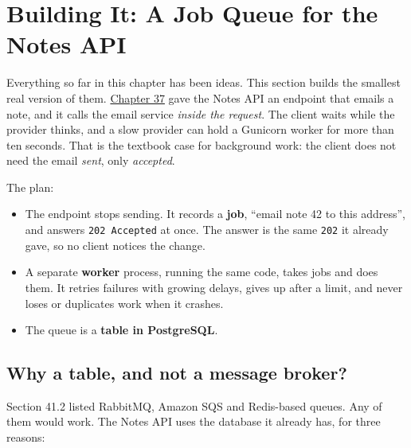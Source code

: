 \setcounter{section}{4}
\section{Building It: A Job Queue for the Notes API}\label{41-event-driven-architecture:415-building-it-a-job-queue-for-the-notes-api}

Everything so far in this chapter has been ideas. This section builds the smallest real version of them. \hyperref[ch:37-reliability]{Chapter 37} gave the Notes API an endpoint that emails a note, and it calls the email service \emph{inside the request}. The client waits while the provider thinks, and a slow provider can hold a Gunicorn worker for more than ten seconds. That is the textbook case for background work: the client does not need the email \emph{sent}, only \emph{accepted}.

The plan:

\begin{itemize}
\tightlist
\item
  The endpoint stops sending. It records a \textbf{job}, ``email note 42 to this address'', and answers \texttt{202\ Accepted} at once. The answer is the same \texttt{202} it already gave, so no client notices the change.
\item
  A separate \textbf{worker} process, running the same code, takes jobs and does them. It retries failures with growing delays, gives up after a limit, and never loses or duplicates work when it crashes.
\item
  The queue is a \textbf{table in PostgreSQL}.
\end{itemize}

\subsection*{Why a table, and not a message broker?}\label{41-event-driven-architecture:why-a-table-and-not-a-message-broker}

Section 41.2 listed RabbitMQ, Amazon SQS and Redis-based queues. Any of them would work. The Notes API uses the database it already has, for three reasons:

